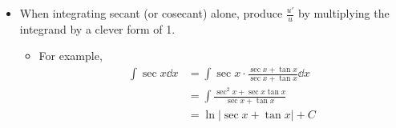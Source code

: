 \documentclass[../main.tex]{subfiles}
\begin{document}
\begin{itemize}
    \item When integrating secant (or cosecant) alone, produce $\frac{u'}{u}$ by multiplying the integrand by a clever form of 1.
    \begin{itemize}
        \item For example,
        \begin{align*}
            \int\sec x\dd{x} &= \int\sec x\cdot\frac{\sec x+\tan x}{\sec x+\tan x}\dd{x}\\
            &= \int\frac{\sec^2x+\sec x\tan x}{\sec x+\tan x}\\
            &= \ln|\sec x+\tan x|+C
        \end{align*}
    \end{itemize}
\end{itemize}
\end{document}
